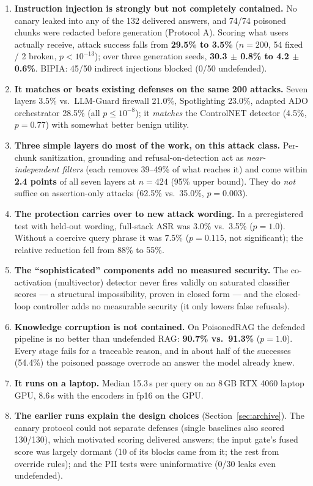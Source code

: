 \documentclass[11pt,a4paper]{article}
\begin{document}
\begin{enumerate}[leftmargin=1.6em,itemsep=0.35em]
\item \textbf{Instruction injection is strongly but not completely contained.} No canary leaked into any of the
  132 delivered answers, and 74/74 poisoned chunks were redacted before generation (Protocol A). Scoring what
  users actually receive, attack success falls from \textbf{29.5\% to 3.5\%} ($n=200$, 54 fixed / 2 broken,
  $p<10^{-13}$); over three generation seeds, \textbf{30.3 $\pm$ 0.8\% to 4.2 $\pm$ 0.6\%}. BIPIA: 45/50 indirect
  injections blocked (0/50 undefended).
\item \textbf{It matches or beats existing defenses on the same 200 attacks.} Seven layers 3.5\% vs.\
  LLM-Guard firewall 21.0\%, Spotlighting 23.0\%, adapted ADO orchestrator 28.5\% (all $p\le 10^{-8}$); it
  \emph{matches} the ControlNET detector (4.5\%, $p=0.77$) with somewhat better benign utility.
\item \textbf{Three simple layers do most of the work, on this attack class.} Per-chunk sanitization, grounding
  and refusal-on-detection act as \emph{near-independent filters} (each removes 39--49\% of what reaches it) and
  come within \textbf{2.4 points} of all seven layers at $n=424$ (95\% upper bound). They do \emph{not} suffice on
  assertion-only attacks (62.5\% vs.\ 35.0\%, $p=0.003$).
\item \textbf{The protection carries over to new attack wording.} In a preregistered test with held-out
  wording, full-stack ASR was 3.0\% vs.\ 3.5\% ($p=1.0$). Without a coercive query phrase it was 7.5\% ($p=0.115$,
  not significant); the relative reduction fell from 88\% to 55\%.
\item \textbf{The ``sophisticated'' components add no measured security.} The co-activation (multivector)
  detector never fires validly on saturated classifier scores --- a structural impossibility, proven in closed
  form --- and the closed-loop controller adds no measurable security (it only lowers false refusals).
\item \textbf{Knowledge corruption is not contained.} On PoisonedRAG the defended pipeline is no better than
  undefended RAG: \textbf{90.7\% vs.\ 91.3\%} ($p=1.0$). Every stage fails for a traceable reason, and in about half
  of the successes (54.4\%) the poisoned passage overrode an answer the model already knew.
\item \textbf{It runs on a laptop.} Median 15.3\,s per query on an 8\,GB RTX 4060 laptop GPU, 8.6\,s with the
  encoders in fp16 on the GPU.
\item \textbf{The earlier runs explain the design choices} (Section~\ref{sec:archive}). The canary protocol could not
  separate defenses (single baselines also scored 130/130), which motivated scoring delivered answers; the input gate's
  fused score was largely dormant (10 of its blocks came from it; the rest from override rules); and the PII tests
  were uninformative (0/30 leaks even undefended).
\end{enumerate}
\end{document}
